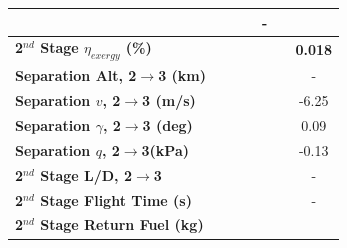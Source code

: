 \begin{table}[ht]
\begin{tabular}{l c c c c c c}
		& \firstsecondSeparationgammamThreeStandard
		& \firstsecondSeparationgammamThreeOneHundredFive
		& \firstsecondSeparationgammamThreeOneHundredTen
		& -
		\\
		\hline 
		\textbf{2$^{nd}$ Stage $\eta_{exergy}$ (\%)}
		& \textbf{\secondExergyEffmThreeNinety}
		& \textbf{\secondExergyEffmThreeNinetyFive}
		& \textbf{\secondExergyEffmThreeStandard}
		& \textbf{\secondExergyEffmThreeOneHundredFive}
		& \textbf{\secondExergyEffmThreeOneHundredTen}
		& \textbf{0.018}
		\\
		\textbf{Separation Alt, 2$\rightarrow$3 (km)}
		& \secondthirdSeparationAltmThreeNinety
		& \secondthirdSeparationAltmThreeNinetyFive
		& \secondthirdSeparationAltmThreeStandard
		& \secondthirdSeparationAltmThreeOneHundredFive
		& \secondthirdSeparationAltmThreeOneHundredTen
		& -
		\\
		\textbf{Separation $v$, 2$\rightarrow$3 (m/s)}
		& \secondthirdSeparationvmThreeNinety
		& \secondthirdSeparationvmThreeNinetyFive
		& \secondthirdSeparationvmThreeStandard
		& \secondthirdSeparationvmThreeOneHundredFive
		& \secondthirdSeparationvmThreeOneHundredTen
		&-6.25
		\\
		\textbf{Separation $\gamma$, 2$\rightarrow$3 (deg)}
		& \secondthirdSeparationgammamThreeNinety
		& \secondthirdSeparationgammamThreeNinetyFive
		& \secondthirdSeparationgammamThreeStandard
		& \secondthirdSeparationgammamThreeOneHundredFive
		& \secondthirdSeparationgammamThreeOneHundredTen
		&0.09
		\\
		\textbf{Separation $q$, 2$\rightarrow$3(kPa)}
		& \secondthirdSeparationqmThreeNinety
		& \secondthirdSeparationqmThreeNinetyFive
		& \secondthirdSeparationqmThreeStandard
		& \secondthirdSeparationqmThreeOneHundredFive
		& \secondthirdSeparationqmThreeOneHundredTen
		&-0.13
		\\
		\textbf{2$^{nd}$ Stage L/D, 2$\rightarrow$3}
		& \secondthirdSeparationLDmThreeNinety
		& \secondthirdSeparationLDmThreeNinetyFive
		& \secondthirdSeparationLDmThreeStandard
		& \secondthirdSeparationLDmThreeOneHundredFive
		& \secondthirdSeparationLDmThreeOneHundredTen
		& -
		\\
		\textbf{2$^{nd}$ Stage Flight Time (s)}
		& \secondFlightTimemThreeNinety
		& \secondFlightTimemThreeNinetyFive
		& \secondFlightTimemThreeStandard
		& \secondFlightTimemThreeOneHundredFive
		& \secondFlightTimemThreeOneHundredTen
		& -
		\\
		\textbf{2$^{nd}$ Stage Return Fuel (kg)}
		& \returnFuelmThreeNinety
		& \returnFuelmThreeNinetyFive
		& \returnFuelmThreeStandard

\end{tabular}
\end{table}
